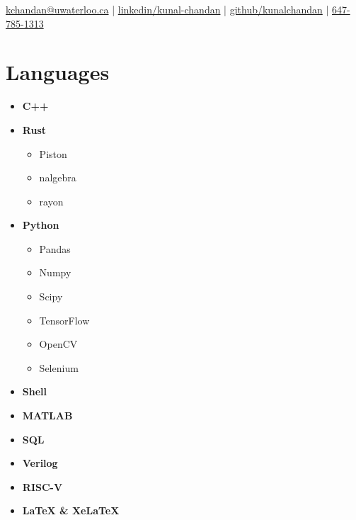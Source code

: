 \documentclass[]{chandan-cv}
\begin{document}
%
%

%
%
{
	\href{mailto:kchandan@uwaterloo.ca}{kchandan@uwaterloo.ca} \quad
	| \quad
	\href{https://www.linkedin.com/in/kunal-chandan/}{linkedin/kunal-chandan} \quad
	| \quad
	\href{http://github.com/kunalchandan}{github/kunalchandan} \quad
	| \quad
	\href{tel:6477851313}{647-785-1313}
}

%
%

\begin{minipage}[t]{0.23\textwidth}


\section{Languages}
	\begin{itemize}
		\setlength\itemsep{-0.2em}
		\item \textbf{C++}
		\item \textbf{Rust}
				\begin{itemize}
						\setlength\itemsep{-0.17em}
						\item Piston
						\item nalgebra
						\item rayon
				\end{itemize}
		\item \textbf{Python}
			\begin{itemize}
				\setlength\itemsep{-0.17em}
				\item Pandas
				\item Numpy
				\item Scipy
				\item TensorFlow
				\item OpenCV
				\item Selenium
			\end{itemize}
		\item \textbf{Shell}
		\item \textbf{MATLAB}
		\item \textbf{SQL}
		\item \textbf{Verilog}
		\item \textbf{RISC-V}
		\item \textbf{LaTeX \& XeLaTeX}
	\end{itemize}


\end{minipage}
\end{document}
